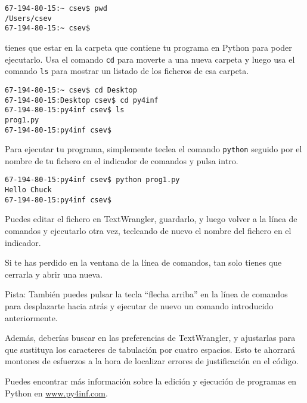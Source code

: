 \beforeverb
\begin{verbatim}
67-194-80-15:~ csev$ pwd
/Users/csev
67-194-80-15:~ csev$ 
\end{verbatim}
\afterverb
%
tienes que estar en la carpeta que contiene tu programa en Python
para poder ejecutarlo. Usa el comando {\tt cd} para moverte a una nueva carpeta
y luego usa el comando {\tt ls} para mostrar un listado de los ficheros
de esa carpeta.

\beforeverb
\begin{verbatim}
67-194-80-15:~ csev$ cd Desktop
67-194-80-15:Desktop csev$ cd py4inf
67-194-80-15:py4inf csev$ ls
prog1.py
67-194-80-15:py4inf csev$ 
\end{verbatim}
\afterverb
%
Para ejecutar tu programa, simplemente teclea el comando {\tt python} seguido
por el nombre de tu fichero en el indicador de comandos y pulsa intro.

\beforeverb
\begin{verbatim}
67-194-80-15:py4inf csev$ python prog1.py
Hello Chuck
67-194-80-15:py4inf csev$ 
\end{verbatim}
\afterverb
%
Puedes editar el fichero en TextWrangler, guardarlo, y luego volver
a la línea de comandos y ejecutarlo otra vez, tecleando de nuevo
el nombre del fichero en el indicador.

Si te has perdido en la ventana de la línea de comandos, tan solo tienes
que cerrarla y abrir una nueva.

Pista: También puedes pulsar la tecla ``flecha arriba'' en la línea de comandos para
desplazarte hacia atrás y ejecutar de nuevo un comando introducido anteriormente.

Además, deberías buscar en las preferencias de TextWrangler, y ajustarlas para
que sustituya los caracteres de tabulación por cuatro espacios. Esto te ahorrará
montones de esfuerzos a la hora de localizar errores de justificación en el código.

Puedes encontrar más información sobre la edición y ejecución de
programas en Python en \url{www.py4inf.com}.


